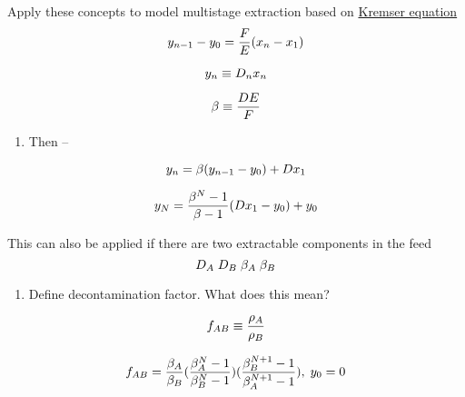 \documentclass[aspectratio=1610,pdftex,dvipsnames,compress,xcolor={dvipsnames}]{beamer}
\begin{document}
\addtocounter{framenumber}{-2} 
\begin{frame}{Apply these concepts to model multistage extraction based on \href{http://wwwcourses.sens.buffalo.edu/ce407/notes/ce407_notes_Lecture03.pdf}{Kremser equation}}
    \begin{equation}
        \Large
        y_{n-1} - y_0 = \frac{F}{E}(x_n-x_1)
    \end{equation}
    
    \begin{equation}
        \Large
        y_n \equiv D_nx_n
    \end{equation}
    
    \begin{equation}
        \Large
        \beta \equiv \frac{DE}{F}
    \end{equation}
    
    \vspace*{\fill}

    \begin{enumerate}[topsep=0pt,itemsep=1pt,leftmargin=*,label=(\arabic*)]
        \item[]Then -- 
    \end{enumerate}

    \vspace*{\fill}

    \begin{equation}
        \Large
        y_n = \beta (y_{n-1} - y_0) + Dx_1
    \end{equation}

    \begin{equation}
        \Large
        y_N = \frac{\beta^N - 1}{\beta - 1}(Dx_1-y_0) +y_0
    \end{equation}
\end{frame}


\begin{frame}{This can also be applied if there are two extractable components in the feed}
    \begin{equation}
        \LARGE
        D_A \; D_B \; \beta_A \; \beta_B
    \end{equation}
    
    \vspace*{\fill}

    \begin{enumerate}[topsep=0pt,itemsep=18pt,leftmargin=*,label=(\arabic*)]
        \item[]Define decontamination factor. What does this mean?
    \end{enumerate}

    \vspace*{\fill}

    \begin{equation}
        \LARGE
        f_{AB} \equiv \frac{\rho_A}{\rho_B}
    \end{equation}

    \begin{equation}
        \LARGE
        f_{AB} = \frac{\beta_A}{\beta_B}(\frac{\beta^N_A - 1}{\beta^N_B - 1})(\frac{\beta^{N+1}_B - 1}{\beta^{N+1}_A - 1}), \; y_0 = 0
    \end{equation}
\end{frame}
\end{document}

